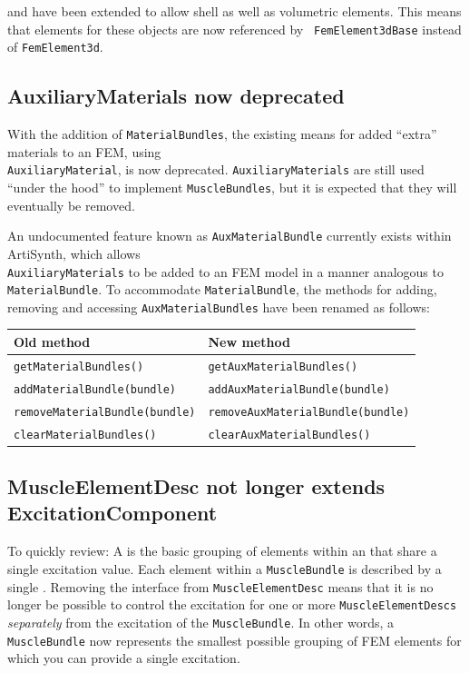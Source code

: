 \documentclass{article}
\begin{document}
 and
 have been
extended to allow shell as well as volumetric elements. This means
that elements for these objects are now referenced by {\tt
FemElement3dBase} instead of {\tt FemElement3d}.

\subsection*{AuxiliaryMaterials now deprecated}

With the addition of {\tt MaterialBundles}, the existing means for
added ``extra'' materials to an FEM, using \\
{\tt AuxiliaryMaterial}, is
now deprecated. {\tt AuxiliaryMaterials} are still used ``under the
hood'' to implement {\tt MuscleBundles}, but it is expected that they
will eventually be removed.

An undocumented feature known as {\tt AuxMaterialBundle} currently
exists within ArtiSynth, which allows \\ 
{\tt AuxiliaryMaterials} to be
added to an FEM model in a manner analogous to {\tt MaterialBundle}.
To accommodate {\tt MaterialBundle}, the methods for adding, removing
and accessing {\tt AuxMaterialBundles} have been renamed as follows:

\begin{tabular}{ll}
\hline
Old method & New method \\
\hline
{\tt getMaterialBundles()} & {\tt getAuxMaterialBundles()} \\
{\tt addMaterialBundle(bundle)} & {\tt addAuxMaterialBundle(bundle)} \\
{\tt removeMaterialBundle(bundle)} & {\tt removeAuxMaterialBundle(bundle)} \\
{\tt clearMaterialBundles()} & {\tt clearAuxMaterialBundles()}\\
\hline
\end{tabular}

\subsection*{MuscleElementDesc not longer extends ExcitationComponent}

To quickly review: A
 is the basic
grouping of elements within an
 that share a
single excitation value.  Each element within a {\tt MuscleBundle} is
described by a single
. Removing the
 interface
from {\tt MuscleElementDesc} means that it is no longer be possible to
control the excitation for one or more {\tt MuscleElementDescs} {\it
separately} from the excitation of the {\tt MuscleBundle}. In other
words, a {\tt MuscleBundle} now represents the smallest possible
grouping of FEM elements for which you can provide a single
excitation.
\end{document}
